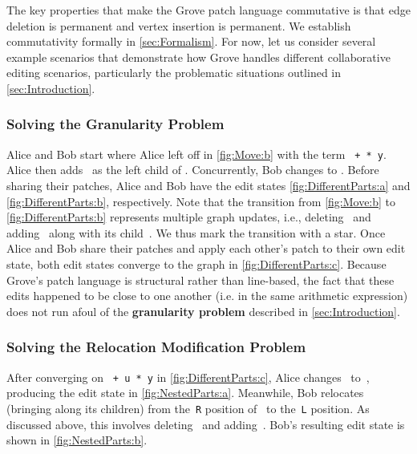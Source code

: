 The key properties that make the Grove patch language commutative is that 
edge deletion is permanent and vertex insertion is permanent.
We establish commutativity formally in \autoref{sec:Formalism}.
For now, let us consider several example scenarios that demonstrate 
how Grove handles different collaborative editing scenarios, particularly 
the problematic situations outlined in \autoref{sec:Introduction}. 

\subsubsection{Solving the Granularity Problem}%
\label{sub:Editing Different Parts of the Code}

Alice and Bob start where Alice left off in \autoref{fig:Move:b} 
with the term \texttt{\hole{} + \hole{} * y}.
Alice then adds~\vDifferentPartsAlice{} as the left child of \vSimpleTimes{}.
Concurrently, Bob changes \vSimpleY{} to \vDifferentPartsBob{}.
Before sharing their patches,
Alice and Bob have the edit states \autoref{fig:DifferentParts:a} and \autoref{fig:DifferentParts:b}, respectively.
Note that the transition from \autoref{fig:Move:b} to \autoref{fig:DifferentParts:b}
represents multiple graph updates,
i.e., deleting~\eSimpleY{} and adding~\eDifferentPartsBob{} along with its child~\vDifferentPartsBob{}.
We thus mark the transition with a star.
Once Alice and Bob share their patches and apply each other's patch to their own edit state,
both edit states converge to the graph in \autoref{fig:DifferentParts:c}. 
Because Grove's patch language is structural rather than line-based, the fact that these edits happened to be close to one another (i.e. in the same arithmetic expression) does not run afoul of the \textbf{granularity problem} described in \autoref{sec:Introduction}.


\subsubsection{Solving the Relocation Modification Problem}%
\label{sub:Editing Nested Parts of the Code}

After converging on \texttt{\hole{} + u * y} in \autoref{fig:DifferentParts:c}, 
Alice changes~\vDifferentPartsAlice{} to~\vNestedPartsAlice{},
producing the edit state in \autoref{fig:NestedParts:a}.
Meanwhile, Bob relocates~\vSimpleTimes{} (bringing along its children)
from the~\texttt{R} position of~\vWrapPlus{} to the~\texttt{L} position. As discussed above, this involves deleting~\eMoveTimes{} and adding~\eNestedPartsBob{}.
Bob's resulting edit state is shown in \autoref{fig:NestedParts:b}.

